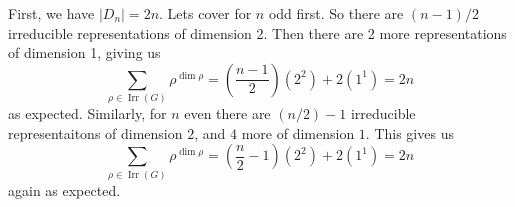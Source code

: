 \begin{example}
\begin{center}
\begin{tabular}{lccc}
    \end{tabular}
  \end{center}
  First, we have $\lvert D_n \rvert = 2n$. Lets cover for $n$ odd first. So there are $(n-1)/2$ irreducible representations of dimension 2.  Then there are 2 more representations of dimension 1, giving us
  \[
    \sum_{\rho \in \operatorname{Irr}(G)} \rho^{\dim\rho}
    = \left(\frac{n-1}2\right) (2^2) + 2(1^1)
    = 2n 
    \]
  as expected. Similarly, for $n$ even there are $(n/2)-1$ irreducible representaitons of dimension $2$, and $4$ more of dimension $1$. This gives us   
  \[
    \sum_{\rho \in \operatorname{Irr}(G)} \rho^{\dim\rho}
    = \left(\frac n2 - 1\right) (2^2) + 2(1^1)
    = 2n 
    \]
    again as expected. 
\end{example}

